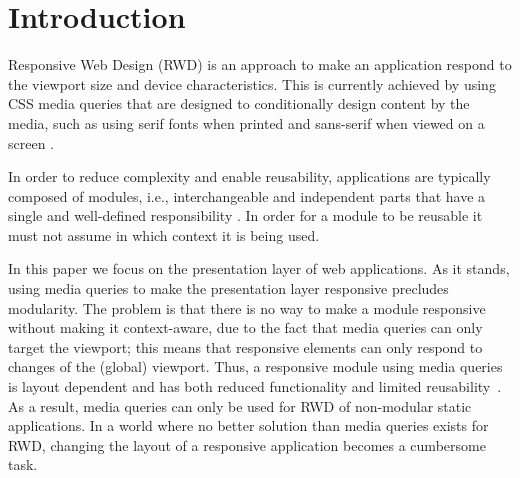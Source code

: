 \documentclass{acm_proc_article-sp}
\begin{document}

\section{Introduction}

  Responsive Web Design (RWD) is an approach to make an application respond to the viewport size and device characteristics.
  This is currently achieved by using CSS media queries that are designed to conditionally design content by the media, such as using serif fonts when printed and sans-serif when viewed on a screen \cite{w3c_css_mq}.

  In order to reduce complexity and enable reusability, applications are typically composed of modules, i.e., interchangeable and independent parts that have a single and well-defined responsibility \cite{parnas1972criteria}.
  In order for a module to be reusable it must not assume in which context it is being used.

  In this paper we focus on the presentation layer of web applications.
  As it stands, using media queries to make the presentation layer responsive precludes modularity.
  The problem is that there is no way to make a module responsive without making it context-aware, due to the fact that media queries can only target the viewport; this means that responsive elements can only respond to changes of the (global) viewport.
  Thus, a responsive module using media queries is layout dependent and has both reduced functionality and limited reusability~\cite{elq-thesis}.
  As a result, media queries can only be used for RWD of non-modular static applications.
  In a world where no better solution than media queries exists for RWD, changing the layout of a responsive application becomes a cumbersome task.
\end{document}
